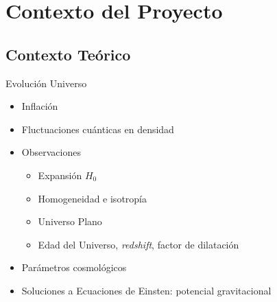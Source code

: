 \documentclass{beamer}
\begin{document}
\section{Contexto del Proyecto}
\subsection{Contexto Teórico}
\begin{frame}{Evolución Universo}
	\begin{block}{}
		\begin{itemize}
			\item Inflación
			\item Fluctuaciones cuánticas en densidad
			\item Observaciones
			\begin{itemize}
				\item Expansión $H_0$
				\item Homogeneidad e isotropía
				\item Universo Plano
				\item Edad del Universo, \textit{redshift}, factor de dilatación
			\end{itemize}
			\item Parámetros cosmológicos
			\item Soluciones a Ecuaciones de Einsten: potencial gravitacional 
		\end{itemize}
	\end{block}
\end{frame}
\end{document}
